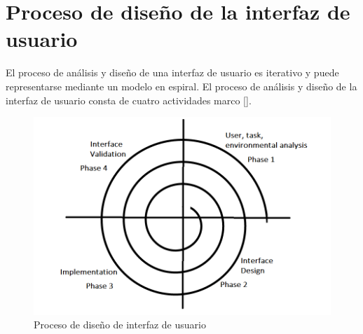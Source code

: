 \section{Proceso de diseño de la interfaz de usuario}
El proceso de análisis y diseño de una interfaz de usuario es iterativo y puede representarse mediante un modelo en espiral. El proceso de análisis y diseño de la interfaz de usuario consta de cuatro actividades marco [\cite{36,37}].

\begin{figure}[h]
\centering
\includegraphics[scale=0.3]{Graphics/espiral}
\caption{Proceso de diseño de interfaz de usuario}
\label{fig:espiral}
\end{figure}

